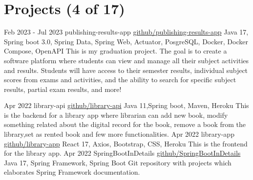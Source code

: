 \documentclass[letterpaper]{twentysecondcv} %
\begin{document}
\section{Projects (4 of 17)}
\begin{twenty} %
	\twentyitem
    		{Feb 2023 -}
		{Jul 2023}
        		{publishing-results-app}
        		{\href{https://github.com/SmartW0rker/publishing-results-app}{github/publishing-results-app}}
        		{Java 17, Spring boot 3.0, Spring Data, Spring Web, Actuator, PosgreSQL, Docker, Docker Compose, OpenAPI}
        		{\hspace*{1em}This is my graduation project. The goal is to create a software platform where students can view and manage all their subject activities and results. Students will have access to their semester results, individual subject scores from exams and activities, and the ability to search for specific subject results, partial exam results, and more!\vspace{1em}}

	\twentyitem
    		{Apr 2022}
		{}
        		{library-api}
        		{\href{https://github.com/SmartW0rker/library-api}{github/library-api}}
        		{Java 11,Spring boot, Maven, Heroku}
        		{This is the backend for a library app where librarian can add new book, modify something related about the digital record for the book, remove a book from the library,set as rented book and few more functionalities.\vspace{1em}}
	\twentyitem
    		{Apr 2022}
		{}
        		{library-app}
        		{\href{https://github.com/SmartW0rker/library-api}{github/library-app}}
        		{React 17, Axios, Bootstrap, CSS, Heroku}
        		{This is the frontend for the library app.\vspace{1em}}
	\twentyitem
    		{Apr 2022}
		{}
        		{SpringBootInDetails}
        		{\href{https://github.com/SmartW0rker/SpringBootInDetails}{github/SpringBootInDetails}}
        		{Java 17, Spring Framework, Spring Boot}
        		{Git repository with projects which elaborates Spring Framework documentation.}
                
\end{twenty}
\end{document}
